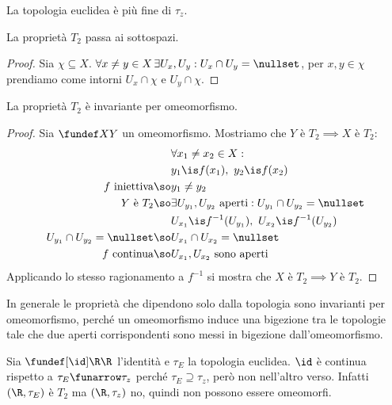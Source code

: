 \begin{oss}
La topologia euclidea è più fine di $\tau_z$.
\end{oss}

\begin{prop}
	La proprietà $T_2$ passa ai sottospazi.
\end{prop}

\begin{proof}
	Sia $\chi\subseteq X$.
	$\forall x\neq y\in X\,\exists U_x,U_y:U_x\cap U_y=\nullset$,
	per $x,y\in\chi$ prendiamo come intorni $U_x\cap\chi$ e $U_y\cap\chi$.
\end{proof}

\begin{prop}
	La proprietà $T_2$ è invariante per omeomorfismo.
\end{prop}

\begin{proof}
	Sia $\fundef XY$ un omeomorfismo. Mostriamo che $Y\text{ è }T_2\implies X\text{ è }T_2$:
	\begin{align*}
		&\forall x_1\neq x_2\in X:\\
		&y_1\is f(x_1),\ y_2\is f(x_2)\\
		f\text{ iniettiva}\so&y_1\neq y_2\\
		Y\text{ è }T_2\so&\exists U_{y_1},U_{y_2}\text{ aperti}:U_{y_1}\cap U_{y_2}=\nullset\\
		&U_{x_1}\is f^{-1}(U_{y_1}),\ U_{x_2}\is f^{-1}(U_{y_2})\\
		U_{y_1}\cap U_{y_2}=\nullset\so&U_{x_1}\cap U_{x_2}=\nullset\\
		f\text{ continua}\so&U_{x_1}, U_{x_2}\text{ sono aperti}
	\end{align*}
	Applicando lo stesso ragionamento a $f^{-1}$ si mostra che $X\text{ è }T_2\implies Y\text{ è }T_2$.
\end{proof}

\begin{oss}
	In generale le proprietà che dipendono solo dalla topologia sono invarianti per omeomorfismo, perché un omeomorfismo induce una bigezione tra le topologie tale che due aperti corrispondenti sono messi in bigezione dall'omeomorfismo.
\end{oss}

\begin{es}
	Sia $\fundef[\id]\R\R$ l'identità e $\tau_E$ la topologia euclidea.
	$\id$ è continua rispetto a $\tau_E\funarrow\tau_z$ perché $\tau_E\supseteq\tau_z$,
	però non nell'altro verso.
	Infatti $(\R,\tau_E)$ è $T_2$ ma $(\R,\tau_z)$ no,
	quindi non possono essere omeomorfi.
\end{es}

